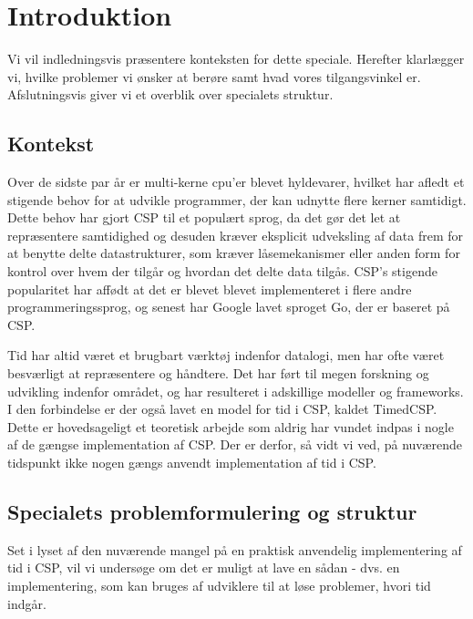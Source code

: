 \chapter{Introduktion}
Vi vil indledningsvis præsentere konteksten for dette speciale. Herefter klarlægger vi, hvilke problemer vi ønsker at berøre samt hvad vores tilgangsvinkel er. Afslutningsvis giver vi et overblik over specialets struktur. 

\section{Kontekst}
Over de sidste par år er multi-kerne cpu'er blevet hyldevarer, hvilket har afledt et stigende behov for at udvikle programmer, der kan udnytte flere kerner samtidigt. Dette behov har gjort CSP til et populært sprog, da det gør det let at repræsentere samtidighed og desuden kræver eksplicit udveksling af data frem for at benytte delte datastrukturer, som kræver låsemekanismer eller anden form for kontrol over hvem der tilgår og hvordan det delte data tilgås. CSP's stigende popularitet har affødt at det er blevet blevet implementeret i flere andre programmeringssprog, og senest har Google lavet sproget Go, der er baseret på CSP. 

Tid har altid været et brugbart værktøj indenfor datalogi, men har ofte været besværligt at repræsentere og håndtere. Det har ført til megen forskning og udvikling indenfor området, og har resulteret i adskillige modeller og frameworks. I den forbindelse er der også lavet en model for tid i CSP, kaldet TimedCSP. Dette er hovedsageligt et teoretisk arbejde som aldrig har vundet indpas i nogle af de gængse implementation af CSP. Der er derfor, så vidt vi ved, på nuværende tidspunkt ikke nogen gængs anvendt implementation af tid i CSP. 

\section{Specialets problemformulering og struktur}
Set i lyset af den nuværende mangel på en praktisk anvendelig implementering af tid i CSP, vil vi undersøge om det er muligt at lave en sådan - dvs. en implementering, som kan bruges af udviklere til at løse problemer, hvori tid indgår.

